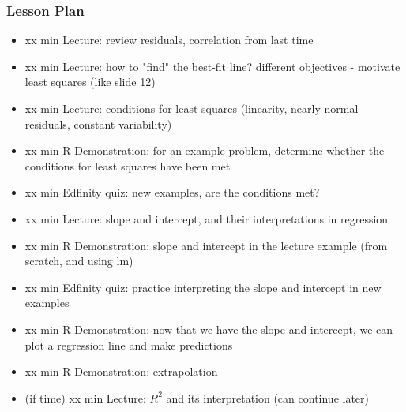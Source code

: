 \begin{frame}
    \frametitle{Lesson Plan}
    \begin{itemize}
        \item xx min Lecture: review residuals, correlation from last time
        \item xx min Lecture: how to "find" the best-fit line? different objectives - motivate least squares (like slide 12)
        \item xx min Lecture: conditions for least squares (linearity, nearly-normal residuals, constant variability)
        \item xx min R Demonstration: for an example problem, determine whether the conditions for least squares have been met 
        \item xx min Edfinity quiz: new examples, are the conditions met?
        \item xx min Lecture: slope and intercept, and their interpretations in regression 
        \item xx min R Demonstration: slope and intercept in the lecture example (from scratch, and using lm)
        \item xx min Edfinity quiz: practice interpreting the slope and intercept in new examples
        \item xx min R Demonstration: now that we have the slope and intercept, we can plot a regression line and make predictions
        \item xx min R Demonstration: extrapolation
        \item (if time) xx min Lecture: $R^2$ and its interpretation (can continue later)
    \end{itemize}
\end{frame}

